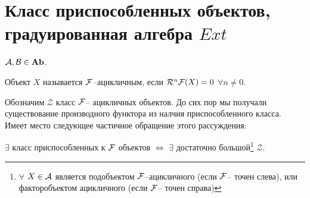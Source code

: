 \documentclass[../hw_main.tex]{subfiles}
\begin{document}
\section{Класс приспособленных объектов, градуированная алгебра $Ext$}
$\mathcal{A}, \mathcal{B} \in \mathbf{Ab}$. 
\begin{to_def}
Объект $X$ называется $\mathcal{F}$--ацикличным, если $\mathcal{R}^{n}\mathcal{F}(X) = 0$ $\forall n\neq 0$.
\end{to_def}
Обозначим $\mathcal{Z}$ класс $\mathcal{F}$-- ацикличных объектов. До сих пор мы получали существование производного функтора из налчия приспособленного класса. Имеет место следующее частичное обращение этого рассуждения:
\begin{to_claim}
$\exists$ класс приспособленных к $\mathcal{F}$ объектов $\Leftrightarrow$
    $\exists$ достаточно большой\footnote{$\forall$ $X \in \mathcal{A}$ является подобъектом $\mathcal{F}$--ацикличного (если $\mathcal{F}$-- точен слева), или факторобъектом ацикличного (если $\mathcal{F}$-- точен справа)} $\mathcal{Z}$.
\end{to_claim}
\end{document}
